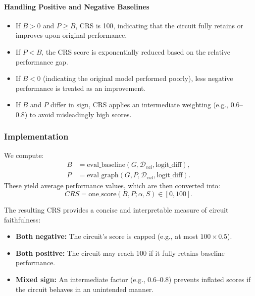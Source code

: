 \paragraph{Handling Positive and Negative Baselines}
\begin{itemize}
    \item If $B > 0$ and $P \geq B$, CRS is 100, indicating that the circuit fully retains or improves upon original performance.
    \item If $P < B$, the CRS score is exponentially reduced based on the relative performance gap.
    \item If $B < 0$ (indicating the original model performed poorly), less negative performance is treated as an improvement.
    \item If $B$ and $P$ differ in sign, CRS applies an intermediate weighting (e.g., 0.6–0.8) to avoid misleadingly high scores.
\end{itemize}

\subsubsection{Implementation}
We compute:
\begin{align}
B &= \text{eval\_baseline}(G, \mathcal{D}_{val}, \text{logit\_diff}), \\
P &= \text{eval\_graph}(G, P, \mathcal{D}_{val}, \text{logit\_diff}).
\end{align}
These yield average performance values, which are then converted into:
\begin{equation}
CRS = \text{one\_score}(B, P; \alpha, S) \in [0,100].
\end{equation}

The resulting CRS provides a concise and interpretable measure of circuit faithfulness:
\begin{itemize}
    \item \textbf{Both negative:} The circuit’s score is capped (e.g., at most $100 \times 0.5$).
    \item \textbf{Both positive:} The circuit may reach 100 if it fully retains baseline performance.
    \item \textbf{Mixed sign:} An intermediate factor (e.g., 0.6–0.8) prevents inflated scores if the circuit behaves in an unintended manner.
\end{itemize}


